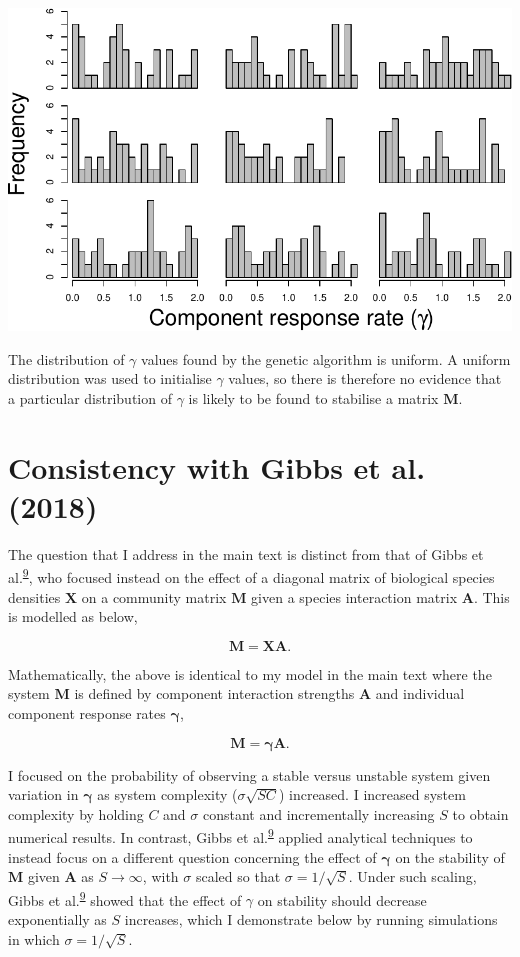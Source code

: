 \documentclass[]{article}
\begin{document}
\includegraphics{SI_files/figure-latex/unnamed-chunk-32-1.pdf}

The distribution of \(\gamma\) values found by the genetic algorithm is
uniform. A uniform distribution was used to initialise \(\gamma\)
values, so there is therefore no evidence that a particular distribution
of \(\gamma\) is likely to be found to stabilise a matrix
\(\mathbf{M}\).

\hypertarget{Gibbs}{\section{Consistency with Gibbs et al.
(2018)}\label{Gibbs}}

The question that I address in the main text is distinct from that of
Gibbs et al.\textsuperscript{\protect\hyperlink{ref-Gibbs2017}{9}}, who
focused instead on the effect of a diagonal matrix of biological species
densities \(\mathbf{X}\) on a community matrix \(\mathbf{M}\) given a
species interaction matrix \(\mathbf{A}\). This is modelled as below,

\[\mathbf{M} = \mathbf{XA}.\]

Mathematically, the above is identical to my model in the main text
where the system \(\mathbf{M}\) is defined by component interaction
strengths \(\mathbf{A}\) and individual component response rates
\(\boldsymbol{\gamma}\),

\[\mathbf{M} = \mathbf{\gamma A}.\]

I focused on the probability of observing a stable versus unstable
system given variation in \(\mathbf{\gamma}\) as system complexity
(\(\sigma\sqrt{SC}\)) increased. I increased system complexity by
holding \(C\) and \(\sigma\) constant and incrementally increasing \(S\)
to obtain numerical results. In contrast, Gibbs et
al.\textsuperscript{\protect\hyperlink{ref-Gibbs2017}{9}} applied
analytical techniques to instead focus on a different question
concerning the effect of \(\mathbf{\gamma}\) on the stability of
\(\mathbf{M}\) given \(\mathbf{A}\) as \(S \to \infty\), with \(\sigma\)
scaled so that \(\sigma = 1/\sqrt{S}\). Under such scaling, Gibbs et
al.\textsuperscript{\protect\hyperlink{ref-Gibbs2017}{9}} showed that
the effect of \(\gamma\) on stability should decrease exponentially as
\(S\) increases, which I demonstrate below by running simulations in
which \(\sigma = 1/\sqrt{S}\).
\end{document}

